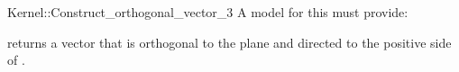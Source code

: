 \begin{ccRefFunctionObjectConcept}{Kernel::Construct_orthogonal_vector_3}
A model for this must provide:


{returns a vector that is orthogonal to the plane  and directed
 to the positive side of .}

\end{ccRefFunctionObjectConcept}
